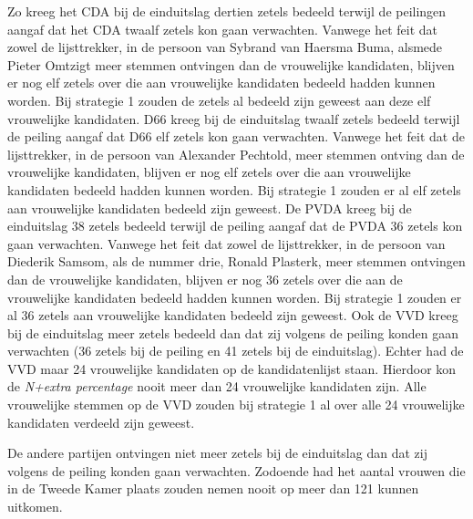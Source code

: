 Zo kreeg het CDA bij de einduitslag dertien zetels bedeeld terwijl de peilingen aangaf dat het CDA twaalf zetels kon gaan verwachten. Vanwege het feit dat zowel de lijsttrekker, in de persoon van Sybrand van Haersma Buma, alsmede Pieter Omtzigt meer stemmen ontvingen dan de vrouwelijke kandidaten, blijven er nog elf zetels over die aan vrouwelijke kandidaten bedeeld hadden kunnen worden. Bij strategie 1 zouden de zetels al bedeeld zijn geweest aan deze elf vrouwelijke kandidaten.
D66 kreeg bij de einduitslag twaalf zetels bedeeld terwijl de peiling aangaf dat D66 elf zetels kon gaan verwachten. Vanwege het feit dat de lijsttrekker, in de persoon van Alexander Pechtold, meer stemmen ontving dan de vrouwelijke kandidaten, blijven er nog elf zetels over die aan vrouwelijke kandidaten bedeeld hadden kunnen worden. Bij strategie 1 zouden er al elf zetels aan vrouwelijke kandidaten bedeeld zijn geweest. De PVDA kreeg bij de einduitslag 38 zetels bedeeld terwijl de peiling aangaf dat de PVDA 36 zetels kon gaan verwachten. Vanwege het feit dat zowel de lijsttrekker, in de persoon van Diederik Samsom, als de nummer drie, Ronald Plasterk, meer stemmen ontvingen dan de vrouwelijke kandidaten, blijven er nog 36 zetels over die aan de vrouwelijke kandidaten bedeeld hadden kunnen worden. Bij strategie 1 zouden er al 36 zetels aan vrouwelijke kandidaten bedeeld zijn geweest. Ook de VVD kreeg bij de einduitslag meer zetels bedeeld dan dat zij volgens de peiling konden gaan verwachten (36 zetels bij de peiling en 41 zetels bij de einduitslag). Echter had de VVD maar 24 vrouwelijke kandidaten op de kandidatenlijst staan. Hierdoor kon de \textit{N+extra percentage} nooit meer dan 24 vrouwelijke kandidaten zijn. Alle vrouwelijke stemmen op de VVD zouden bij strategie 1 al over alle 24 vrouwelijke kandidaten verdeeld zijn geweest. 

De andere partijen ontvingen niet meer zetels bij de einduitslag dan dat zij volgens de peiling konden gaan verwachten. Zodoende had het aantal vrouwen die in de Tweede Kamer plaats zouden nemen nooit op meer dan 121 kunnen uitkomen.   





